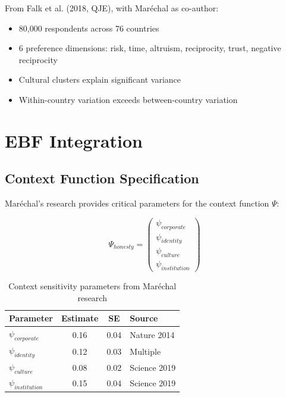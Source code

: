 From Falk et al. (2018, QJE), with Maréchal as co-author:

\begin{itemize}
    \item 80,000 respondents across 76 countries
    \item 6 preference dimensions: risk, time, altruism, reciprocity, trust, negative reciprocity
    \item Cultural clusters explain significant variance
    \item Within-country variation exceeds between-country variation
\end{itemize}

\section{EBF Integration}

\subsection{Context Function Specification}

Maréchal's research provides critical parameters for the context function $\Psi$:

\begin{equation}
\Psi_{honesty} = \begin{pmatrix}
\psi_{corporate} \\
\psi_{identity} \\
\psi_{culture} \\
\psi_{institution}
\end{pmatrix}
\end{equation}

\begin{table}[h]
\centering
\begin{tabular}{lccl}
\hline
\textbf{Parameter} & \textbf{Estimate} & \textbf{SE} & \textbf{Source} \\
\hline
$\psi_{corporate}$ & 0.16 & 0.04 & Nature 2014 \\
$\psi_{identity}$ & 0.12 & 0.03 & Multiple \\
$\psi_{culture}$ & 0.08 & 0.02 & Science 2019 \\
$\psi_{institution}$ & 0.15 & 0.04 & Science 2019 \\
\hline
\end{tabular}
\caption{Context sensitivity parameters from Maréchal research}
\end{table}

